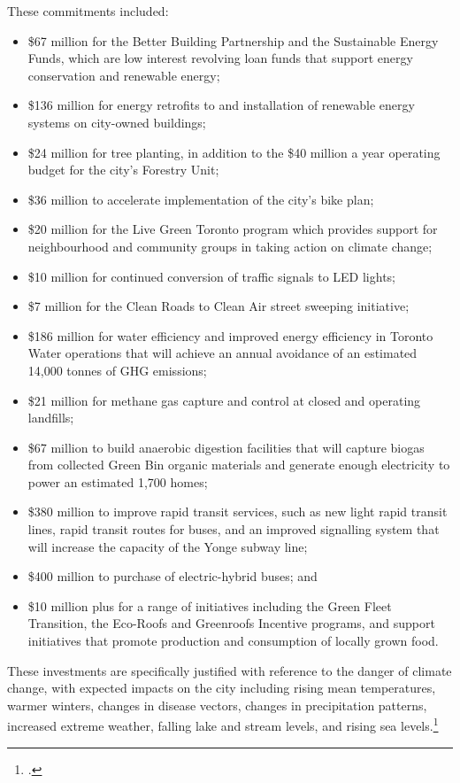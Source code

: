 \documentclass[10pt]{article}
\begin{document}
These commitments included:
\begin{itemize}
	\item \$67 million for the Better Building Partnership and the Sustainable Energy Funds, which are low interest revolving loan funds that support energy conservation and renewable energy;
	\item \$136 million for energy retrofits to and installation of renewable energy systems on city-owned buildings; 
	\item \$24 million for tree planting, in addition to the \$40 million a year operating budget for the city's Forestry Unit; 
	\item \$36 million to accelerate implementation of the city's bike plan; 
	\item \$20 million for the Live Green Toronto program which provides support for neighbourhood and community groups in taking action on climate change; 
	\item \$10 million for continued conversion of traffic signals to LED lights; 
	\item \$7 million for the Clean Roads to Clean Air street sweeping initiative; 
	\item \$186 million for water efficiency and improved energy efficiency in Toronto Water operations that will achieve an annual avoidance of an estimated 14,000 tonnes of GHG emissions; 
	\item \$21 million for methane gas capture and control at closed and operating landfills; 
	\item \$67 million to build anaerobic digestion facilities that will capture biogas from collected Green Bin organic materials and generate enough electricity to power an estimated 1,700 homes; 
	\item \$380 million to improve rapid transit services, such as new light rapid transit lines, rapid transit routes for buses, and an improved signalling system that will increase the capacity of the Yonge subway line; 
	\item \$400 million to purchase of electric-hybrid buses; and 
	\item \$10 million plus for a range of initiatives including the Green Fleet Transition, the Eco-Roofs and Greenroofs Incentive programs, and support initiatives that promote production and consumption of locally grown food.
\end{itemize}



These investments are specifically justified with reference to the danger of climate change, with expected impacts on the city including rising mean temperatures, warmer winters, changes in disease vectors, changes in precipitation patterns, increased extreme weather, falling lake and stream levels, and rising sea levels.\footcite{TorontoEnvOff2007}
\end{document}
